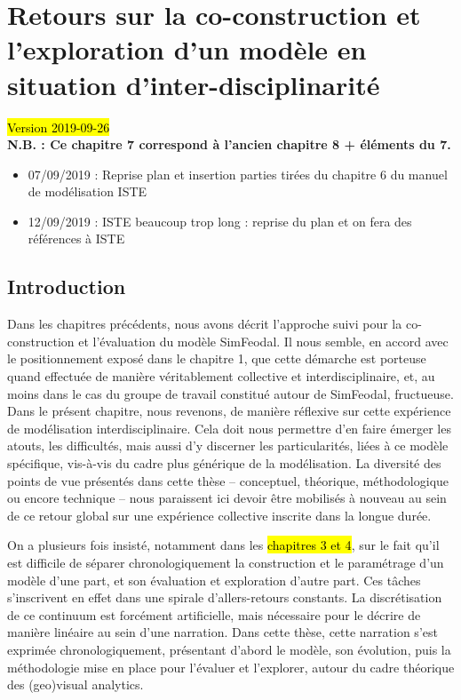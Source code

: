\chapter{Retours sur la co-construction et l'exploration d'un modèle en situation d'inter-disciplinarité}
\label{chap:chap7}
\begin{center}
	{\large \hl{Version 2019-09-26}}\\
	\textbf{N.B. : Ce chapitre 7 correspond à l'ancien chapitre 8 + éléments du 7.}
\end{center}


\begin{itemize}
	\item 07/09/2019 : Reprise plan et insertion parties tirées du chapitre 6 du manuel de modélisation ISTE
	\item 12/09/2019 : ISTE beaucoup trop long : reprise du plan et on fera des références à ISTE
\end{itemize} 

\minitoc


\clearpage
\section*{Introduction}

Dans les chapitres précédents, nous avons décrit l'approche suivi pour la co-construction et l'évaluation du modèle SimFeodal.
Il nous semble, en accord avec le positionnement exposé dans le chapitre 1, que cette démarche est porteuse quand effectuée de manière véritablement collective et interdisciplinaire, et, au moins dans le cas du groupe de travail constitué autour de SimFeodal, fructueuse.
Dans le présent chapitre, nous revenons, de manière réflexive sur cette expérience de modélisation interdisciplinaire.
Cela doit nous permettre d'en faire émerger les atouts, les difficultés, mais aussi d'y discerner les particularités, liées à ce modèle spécifique, vis-à-vis du cadre plus générique de la modélisation.
La diversité des points de vue présentés dans cette thèse -- conceptuel, théorique, méthodologique ou encore technique -- nous paraissent ici devoir être mobilisés à nouveau au sein de ce retour global sur une expérience collective inscrite dans la longue durée.

On a plusieurs fois insisté, notamment dans les \hl{chapitres 3 et 4}, sur le fait qu'il est difficile de séparer chronologiquement la construction et le paramétrage d'un modèle d'une part, et son évaluation et exploration d'autre part.
Ces tâches s'inscrivent en effet dans une spirale d'allers-retours constants.
La discrétisation de ce continuum est forcément artificielle, mais nécessaire pour le décrire de manière linéaire au sein d'une narration.
Dans cette thèse, cette narration s'est exprimée chronologiquement, présentant d'abord le modèle, son évolution, puis la méthodologie mise en place pour l'évaluer et l'explorer, autour du cadre théorique des (geo)visual analytics.

